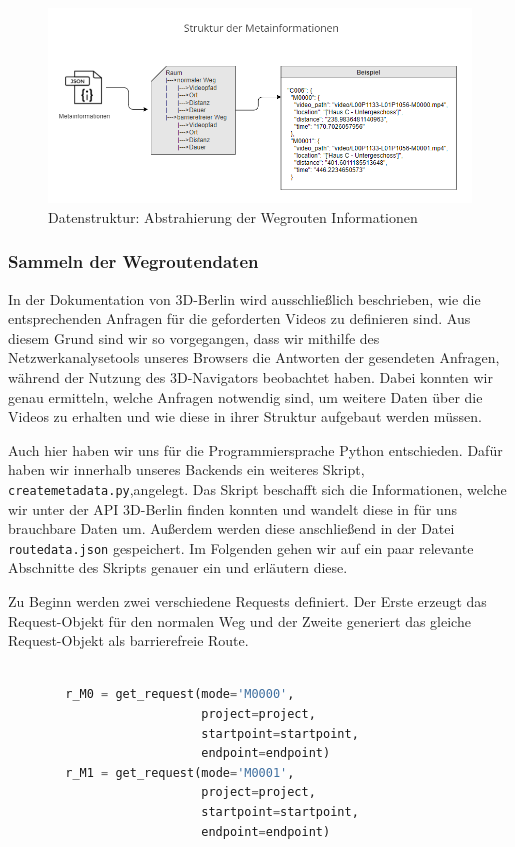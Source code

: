 \begin{figure}[H]
    \includegraphics[width=\textwidth]{Figures/3DNavigator/Metadatenstruktur_Raumfinder.png}
    \caption{Datenstruktur: Abstrahierung der Wegrouten Informationen}
    \label{fig:json-bild}
    \centering
\end{figure}

\subsubsection{Sammeln der Wegroutendaten}

In der Dokumentation von 3D-Berlin wird ausschließlich beschrieben, wie die entsprechenden Anfragen für die geforderten Videos zu definieren sind. Aus diesem Grund sind wir so vorgegangen, dass wir mithilfe des Netzwerkanalysetools unseres Browsers die Antworten der gesendeten Anfragen, während der Nutzung des 3D-Navigators beobachtet haben. Dabei konnten wir genau ermitteln, welche Anfragen notwendig sind, um weitere Daten über die Videos zu erhalten und wie diese in ihrer Struktur aufgebaut werden müssen.

Auch hier haben wir uns für die Programmiersprache Python entschieden. Dafür haben wir innerhalb unseres Backends ein weiteres Skript, \verb|createmetadata.py|,angelegt. Das Skript beschafft sich die Informationen, welche wir unter der API 3D-Berlin finden konnten und wandelt diese in für uns brauchbare Daten um. Außerdem werden diese anschließend in der Datei \verb|routedata.json| gespeichert. Im Folgenden gehen wir auf ein paar relevante Abschnitte des Skripts genauer ein und erläutern diese.

Zu Beginn werden zwei verschiedene Requests definiert. Der Erste erzeugt das Request-Objekt für den normalen Weg und der Zweite generiert das gleiche Request-Objekt als barrierefreie Route.

\begin{lstlisting}[language=Python]

        r_M0 = get_request(mode='M0000',
                           project=project,
                           startpoint=startpoint,
                           endpoint=endpoint)
        r_M1 = get_request(mode='M0001', 
                           project=project, 
                           startpoint=startpoint, 
                           endpoint=endpoint)

\end{lstlisting}

